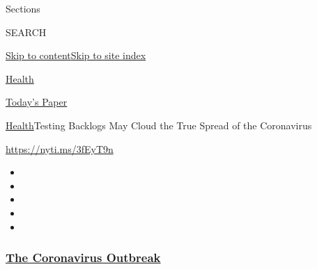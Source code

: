 Sections

SEARCH

\protect\hyperlink{site-content}{Skip to
content}\protect\hyperlink{site-index}{Skip to site index}

\href{https://www.nytimes3xbfgragh.onion/section/health}{Health}

\href{https://myaccount.nytimes3xbfgragh.onion/auth/login?response_type=cookie\&client_id=vi}{}

\href{https://www.nytimes3xbfgragh.onion/section/todayspaper}{Today's
Paper}

\href{/section/health}{Health}\textbar{}Testing Backlogs May Cloud the
True Spread of the Coronavirus

\url{https://nyti.ms/3fEyT9n}

\begin{itemize}
\item
\item
\item
\item
\item
\end{itemize}

\hypertarget{the-coronavirus-outbreak}{%
\subsubsection{\texorpdfstring{\href{https://www.nytimes3xbfgragh.onion/news-event/coronavirus?name=styln-coronavirus-national\&region=TOP_BANNER\&variant=undefined\&block=storyline_menu_recirc\&action=click\&pgtype=Article\&impression_id=036d8260-e387-11ea-8c8a-b7fbae24c18c}{The
Coronavirus
Outbreak}}{The Coronavirus Outbreak}}\label{the-coronavirus-outbreak}}

